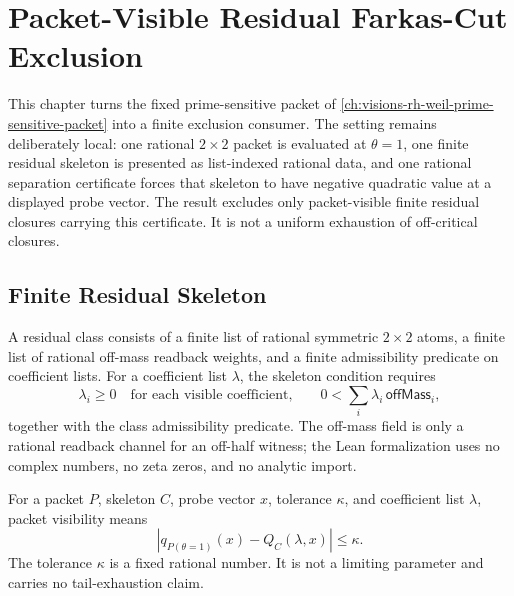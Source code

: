 \chapter{Packet-Visible Residual Farkas-Cut Exclusion}
\label{ch:visions-rh-weil-residual-farkas-cut}

This chapter turns the fixed prime-sensitive packet of
\autoref{ch:visions-rh-weil-prime-sensitive-packet} into a finite exclusion
consumer. The setting remains deliberately local: one rational $2\times2$
packet is evaluated at $\theta=1$, one finite residual skeleton is presented
as list-indexed rational data, and one rational separation certificate forces
that skeleton to have negative quadratic value at a displayed probe vector.
The result excludes only packet-visible finite residual closures carrying this
certificate. It is not a uniform exhaustion of off-critical closures.

\section{Finite Residual Skeleton}
\label{sec:rh-weil-residual-finite-skeleton}

\begin{definition}
\label{def:rh-weil-residual-skeleton}
A residual class consists of a finite list of rational symmetric $2\times2$
atoms, a finite list of rational off-mass readback weights, and a finite
admissibility predicate on coefficient lists. For a coefficient list
$\lambda$, the skeleton condition requires
$$
\lambda_i\ge 0
\quad\text{for each visible coefficient,}
\qquad
0<
\sum_i \lambda_i\,\mathsf{offMass}_i,
$$
together with the class admissibility predicate. The off-mass field is only a
rational readback channel for an off-half witness; the Lean formalization uses
no complex numbers, no zeta zeros, and no analytic import.
\end{definition}

\begin{definition}
\label{def:rh-weil-residual-packet-visibility}
For a packet $P$, skeleton $C$, probe vector $x$, tolerance $\kappa$, and
coefficient list $\lambda$, packet visibility means
$$
\left|
q_{P(\theta=1)}(x)-Q_C(\lambda,x)
\right|
\le \kappa .
$$
The tolerance $\kappa$ is a fixed rational number. It is not a limiting
parameter and carries no tail-exhaustion claim.
\end{definition}

